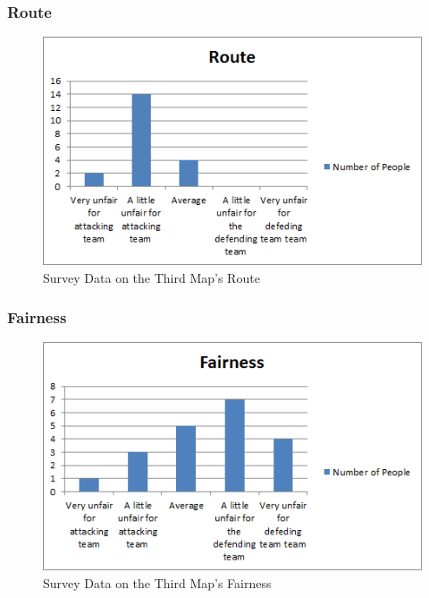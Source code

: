 \documentclass[12pt,a4paper,oneside]{book}
\begin{document}
\subsubsection{Route}
\begin{figure}[H]
	\includegraphics[width=1.0\textwidth]{images/Route3.png}
	\caption{Survey Data on the Third Map's Route}
\end{figure}
\subsubsection{Fairness}
\begin{figure}[H]
	\includegraphics[width=1.0\textwidth]{images/Fair3.png}
	\caption{Survey Data on the Third Map's Fairness}
\end{figure}
\end{document}
